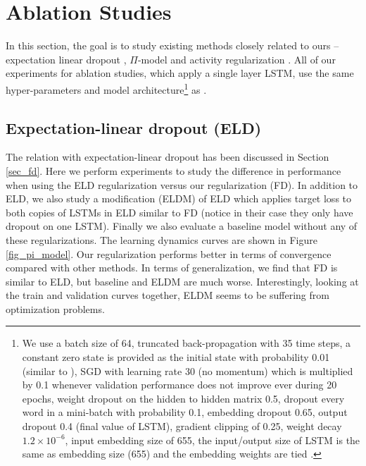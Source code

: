 \documentclass{article} %
\begin{document}


\section{Ablation Studies}
\label{sec_ablation}
In this section, the goal is to study existing methods closely related to ours -- expectation linear dropout \cite{ma2016dropout}, $\Pi$-model \cite{laine2016temporal} and activity regularization \cite{ar_tar}. All of our experiments for ablation studies, which apply a single layer LSTM, use the same hyper-parameters and model architecture\footnote{We use a batch size of 64, truncated back-propagation with 35 time steps, a constant zero state is provided as the initial state with probability 0.01 (similar to \cite{melis2017state}), SGD with learning rate 30 (no momentum) which is multiplied by 0.1 whenever validation performance does not improve ever during 20 epochs, weight dropout on the hidden to hidden matrix 0.5, dropout every word in a mini-batch with probability 0.1, embedding dropout 0.65, output dropout 0.4 (final value of LSTM), gradient clipping of 0.25, weight decay $1.2\times 10^{-6}$, input embedding size of 655, the input/output size of LSTM is the same as embedding size (655) and the embedding weights are tied \citep{inan2016tying, press2016using}.} as \citet{melis2017state}.

\subsection{Expectation-linear dropout (ELD)}\label{subsec:eld}

The relation with expectation-linear dropout \cite{ma2016dropout} has been discussed in Section \ref{sec_fd}. Here we perform experiments to study the difference in performance when using the ELD regularization versus our regularization (FD). In addition to ELD, we also study a modification (ELDM) of ELD which applies target loss to both copies of LSTMs in ELD similar to FD (notice in their case they only have dropout on one LSTM). Finally we also evaluate a baseline model without any of these regularizations. The learning dynamics curves are shown in Figure \ref{fig_pi_model}. Our regularization performs better in terms of convergence compared with other methods. In terms of generalization, we find that FD is similar to ELD, but baseline and ELDM are much worse. Interestingly, looking at the train and validation curves together, ELDM seems to be suffering from optimization problems.
\end{document}
